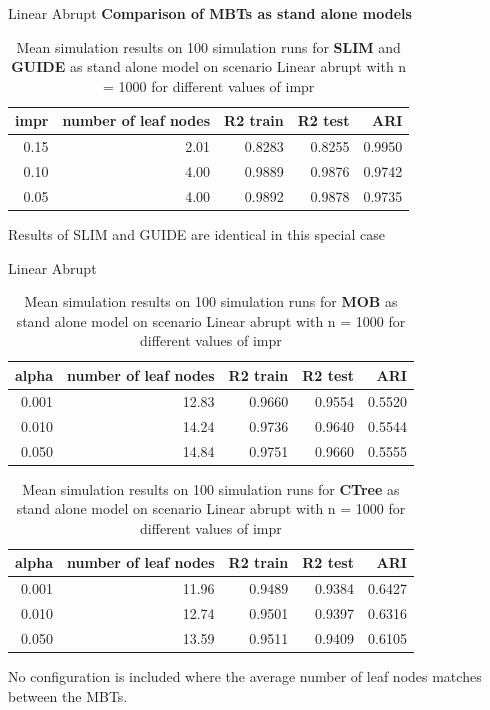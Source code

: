 \documentclass[9pt, xcolor=table]{beamer}
\begin{document}
\begin{frame}{Linear Abrupt}
\textbf{Comparison of MBTs as stand alone models}

\begin{table}
\caption{Mean simulation results on 100 simulation runs for \textbf{SLIM} and \textbf{GUIDE}  as stand alone model on scenario Linear abrupt with n = 1000 for different values of impr }
\centering
\begin{tabular}[t]{r|r|r|r|r}
\hline
impr & number of leaf nodes & R2 train & R2 test & ARI\\
\hline
0.15 & 2.01 & 0.8283 & 0.8255 & 0.9950\\
\hline
0.10 & 4.00 & 0.9889 & 0.9876 & 0.9742\\
\hline
0.05 & 4.00 & 0.9892 & 0.9878 & 0.9735\\
\hline
\end{tabular}
\end{table}    

Results of SLIM and GUIDE are identical in this special case
\end{frame}

\begin{frame}{Linear Abrupt}

\begin{table}

\caption{Mean simulation results on 100 simulation runs for \textbf{MOB} as stand alone model on scenario Linear abrupt with n = 1000 for different values of impr }
\centering
\begin{tabular}[t]{r|r|r|r|r}
\hline
alpha & number of leaf nodes & R2 train & R2 test & ARI\\
\hline
0.001 & 12.83 & 0.9660 & 0.9554 & 0.5520\\
\hline
0.010 & 14.24 & 0.9736 & 0.9640 & 0.5544\\
\hline
0.050 & 14.84 & 0.9751 & 0.9660 & 0.5555\\
\hline
\end{tabular}
\end{table}  

\begin{table}

\caption{Mean simulation results on 100 simulation runs for \textbf{CTree} as stand alone model on scenario Linear abrupt with n = 1000 for different values of impr }
\centering
\begin{tabular}[t]{r|r|r|r|r}
\hline
alpha & number of leaf nodes & R2 train & R2 test & ARI\\
\hline
0.001 & 11.96 & 0.9489 & 0.9384 & 0.6427\\
\hline
0.010 & 12.74 & 0.9501 & 0.9397 & 0.6316\\
\hline
0.050 & 13.59 & 0.9511 & 0.9409 & 0.6105\\
\hline
\end{tabular}
\end{table}

No configuration is included where the average number of leaf nodes matches between the MBTs.
\end{frame}
\end{document}
